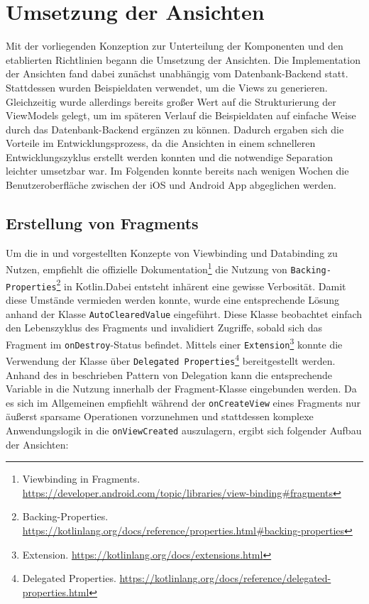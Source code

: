 \newpage

\section{Umsetzung der Ansichten}

Mit der vorliegenden Konzeption zur Unterteilung der Komponenten und den etablierten Richtlinien begann die Umsetzung der Ansichten. Die Implementation der Ansichten fand dabei zunächst unabhängig vom Datenbank-Backend statt. Stattdessen wurden Beispieldaten verwendet, um die Views zu generieren. Gleichzeitig wurde allerdings bereits großer Wert auf die Strukturierung der ViewModels gelegt, um im späteren Verlauf die Beispieldaten auf einfache Weise durch das Datenbank-Backend ergänzen zu können. Dadurch ergaben sich die Vorteile im Entwicklungsprozess, da die Ansichten in einem schnelleren Entwicklungszyklus erstellt werden konnten und die notwendige Separation leichter umsetzbar war. Im Folgenden konnte bereits nach wenigen Wochen die Benutzeroberfläche zwischen der iOS und Android App abgeglichen werden.

\subsection{Erstellung von Fragments}

Um die in  und  vorgestellten Konzepte von Viewbinding und Databinding zu Nutzen, empfiehlt die offizielle Dokumentation\footnote{Viewbinding in Fragments. \url{https://developer.android.com/topic/libraries/view-binding\#fragments}} die Nutzung von \texttt{Backing-Properties}\footnote{Backing-Properties. \url{https://kotlinlang.org/docs/reference/properties.html\#backing-properties}} in Kotlin.Dabei entsteht inhärent eine gewisse Verbosität. Damit diese Umstände vermieden werden konnte, wurde eine entsprechende Lösung anhand der Klasse \texttt{AutoClearedValue} eingeführt. Diese Klasse beobachtet einfach den Lebenszyklus des Fragments und invalidiert Zugriffe, sobald sich das Fragment im \texttt{onDestroy}-Status befindet. Mittels einer \texttt{Extension}\footnote{Extension. \url{https://kotlinlang.org/docs/extensions.html}} konnte die Verwendung der Klasse über \texttt{Delegated Properties}\footnote{Delegated Properties. \url{https://kotlinlang.org/docs/reference/delegated-properties.html}} bereitgestellt werden. Anhand des in  beschrieben Pattern von Delegation kann die entsprechende Variable in die Nutzung innerhalb der Fragment-Klasse eingebunden werden. Da es sich im Allgemeinen empfiehlt während der \texttt{onCreateView} eines Fragments nur äußerst sparsame Operationen vorzunehmen und stattdessen komplexe Anwendungslogik in die \texttt{onViewCreated} auszulagern, ergibt sich folgender Aufbau der Ansichten:

